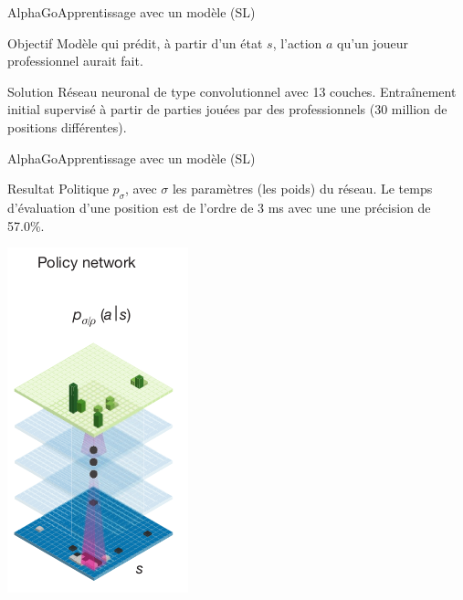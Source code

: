 \begin{frame}{AlphaGo}{Apprentissage avec un modèle (SL)}
    \begin{center}

        \begin{block}{Objectif}
            Modèle qui prédit, à partir d'un état $s$, l'action $a$ qu'un joueur professionnel aurait fait.
        \end{block}
        \pause
        \vspace{1cm}
        \begin{block}{Solution}
            Réseau neuronal de type convolutionnel avec 13 couches.
            Entraînement initial supervisé à partir de parties jouées par des professionnels (30 million de positions différentes).
        \end{block}
    \end{center}
\end{frame}

\begin{frame}{AlphaGo}{Apprentissage avec un modèle (SL)}
    \begin{block}{Resultat}
        Politique $p_\sigma$, avec $\sigma$ les paramètres (les poids) du réseau.
        Le temps d'évaluation d'une position est de l'ordre de 3 ms avec une une précision de 57.0\%.
    \end{block}
    \begin{center}
        \includegraphics[scale=0.4]{ressources/AlphaGo/Policy_Network}
    \end{center}
\end{frame}

